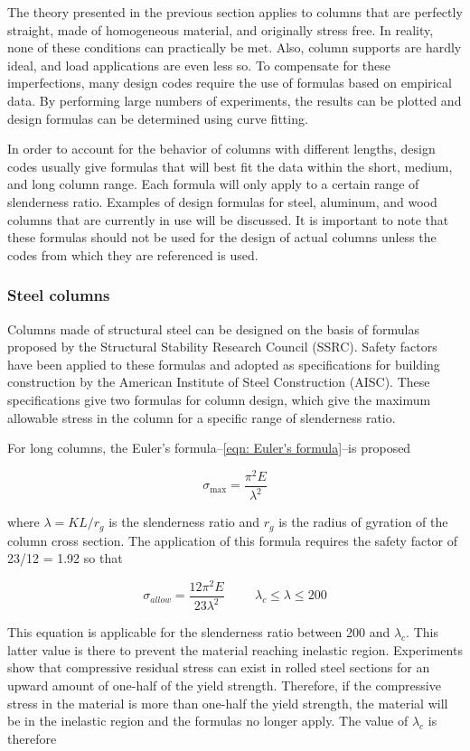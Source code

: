 \documentclass[
10pt,
a4paper,
openany,
svgnames,
]{book}
\begin{document}
The theory presented in the previous section applies to columns that are perfectly straight, made of homogeneous material, and originally stress free. In reality, none of these conditions can practically be met. Also, column supports are hardly ideal, and load applications are even less so. To compensate for these imperfections, many design codes require the use of formulas based on empirical data. By performing large numbers of experiments, the results can be plotted and design formulas can be determined using curve fitting.

In order to account for the behavior of columns with different lengths, design codes usually give formulas that will best fit the data within the short, medium, and long column range. Each formula will only apply to a certain range of slenderness ratio. Examples of design formulas for steel, aluminum, and wood columns that are currently in use will be discussed. It is important to note that these formulas should not be used for the design of actual columns unless the codes from which they are referenced is used.

\subsubsection{Steel columns}

Columns made of structural steel can be designed on the basis of formulas proposed by the Structural Stability Research Council (SSRC). Safety factors have been applied to these formulas and adopted as specifications for building construction by the American Institute of Steel Construction (AISC). These specifications give two formulas for column design, which give the maximum allowable stress in the column for a specific range of slenderness ratio.

For long columns, the Euler’s formula--\cref{eqn: Euler's formula}--is proposed

\[\sigma_{\max} = \frac{\pi^2E}{\lambda^2}\]

where $\lambda = KL/r_g$ is the slenderness ratio and $r_g$ is the radius of gyration of the column cross section. The application of this formula requires the safety factor of 23/12 = 1.92 so that

\[\sigma_{allow} = \frac{12\pi^2E}{23\lambda^2} \hspace{1cm} \lambda_c \leqslant \lambda \leqslant 200\]

This equation is applicable for the slenderness ratio between 200 and $\lambda_c$. This latter value is there to prevent the material reaching inelastic region. Experiments show that compressive residual stress can exist in rolled steel sections for an upward amount of one-half of the yield strength. Therefore, if the compressive stress in the material is more than one-half the yield strength, the material will be in the inelastic region and the formulas no longer apply. The value of $\lambda_c$ is therefore
\end{document}
